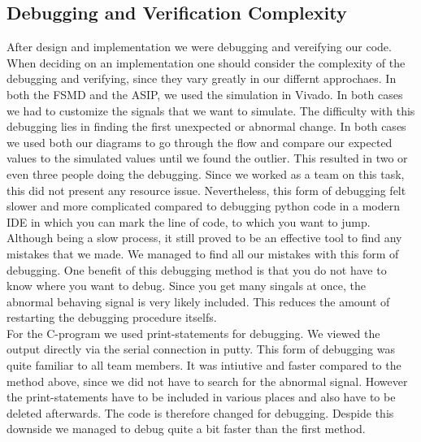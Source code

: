 \documentclass[conference]{IEEEtran}
\begin{document}
\subsection{Debugging and Verification Complexity} \label{sec:debugging}
After design and implementation we were debugging and vereifying our code. When deciding on an implementation one should consider the complexity of the debugging and verifying, since they vary greatly in our differnt approchaes. In both the FSMD and the ASIP, we used the simulation in Vivado. In both cases we had to customize the signals that we want to simulate. The difficulty with this debugging lies in finding the first unexpected or abnormal change. In both cases we used both our diagrams to go through the flow and compare our expected values to the simulated values until we found the outlier. This resulted in two or even three people doing the debugging. Since we worked as a team on this task, this did not present any resource issue. Nevertheless, this form of debugging felt slower and more complicated compared to debugging python code in a modern IDE in which you can mark the line of code, to which you want to jump. Although being a slow process, it still proved to be an effective tool to find any mistakes that we made. We managed to find all our mistakes with this form of debugging. One benefit of this debugging method is that you do not have to know where you want to debug. Since you get many singals at once, the abnormal behaving signal is very likely included. This reduces the amount of restarting the debugging procedure itselfs. \\
For the C-program we used print-statements for debugging. We viewed the output directly via the serial connection in putty. This form of debugging was quite familiar to all team members. It was intiutive and faster compared to the method above, since we did not have to search for the abnormal signal. However the print-statements have to be included in various places and also have to be deleted afterwards. The code is therefore changed for debugging. Despide this downside we managed to debug quite a bit faster than the first method. \\
\end{document}

